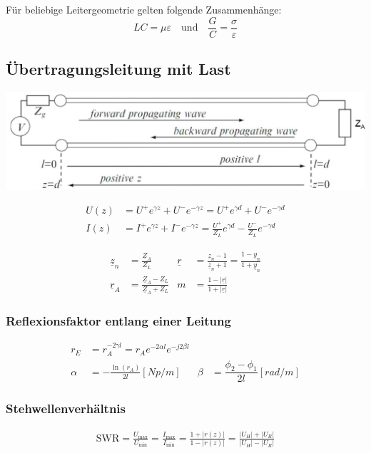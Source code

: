 Für beliebige Leitergeometrie gelten folgende Zusammenhänge:
\[
    LC = \mu\varepsilon \quad \text{und} \quad \frac{G}{C} = \frac{\sigma}{\varepsilon}
\]

\subsection{Übertragungsleitung mit Last}

\includegraphics[width=\columnwidth]{Figures/UebertragungleitungmitLast.png}

\begin{align*}
    U(z) & = U^+ e^{\gamma z} + U^- e^{-\gamma z} = U^+ e^{\gamma d} + U^ - e^{-\gamma d}                      \\
    I(z) & = I^+ e^{\gamma z} + I^- e^{-\gamma z} = \frac{U^+}{Z_L}e^{\gamma d} - \frac{U^-}{Z_L}e^{-\gamma d}
\end{align*}

\begin{align*}
    \underline{z}_n & = \frac{\underline{Z}_A}{Z_L}                     & \underline{r} & = \frac{\underline{z}_n-1}{\underline{z}_n+1}= \frac{1-\underline{y}_n}{1+\underline{y}_n} \\
    \underline{r}_A & = \frac{\underline{Z}_A-Z_L}{\underline{Z}_A+Z_L} & m             & = \frac{1-|\underline{r}|}{1+|\underline{r}|}
\end{align*}
\subsubsection{Reflexionsfaktor entlang einer Leitung}

\begin{align*}
    r_E    & = r_A  ^{-2\gamma l} = r_A  e^{-2\alpha l} e^{-j2\beta l} \\
    \alpha & = -\frac{\ln(r_A)}{2l} [\si{Np/m}] & \beta  & = \dfrac{\phi_2 -\phi_1}{2l} [\si{rad/m}]
\end{align*}

\subsubsection{Stehwellenverhältnis}
\begin{align*}
    \mathrm{SWR} = \frac{U_\text{max}}{U_\text{min}} =
    \frac{I_\text{max}}{I_\text{min}} = \frac{1+|r(z)|}{1-|r(z)|} =
    \frac{|U_H|+|U_R|}{|U_H|-|U_R|}
\end{align*}

